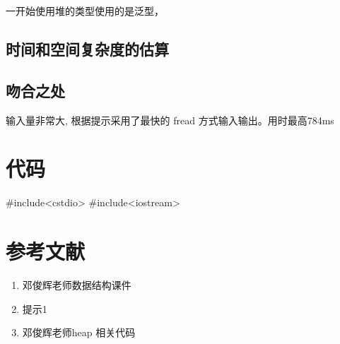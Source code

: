 \documentclass[12pt,a4paper]{ctexart}
\def\tightlist{}
\newenvironment{Shaded}{}{}
\newcommand{\OtherTok}[1]{\textcolor[rgb]{0.00,0.44,0.13}{{#1}}}
\begin{document}
一开始使用堆的类型使用的是泛型，

\subsection{时间和空间复杂度的估算}\label{ux65f6ux95f4ux548cux7a7aux95f4ux590dux6742ux5ea6ux7684ux4f30ux7b97}

\subsection{吻合之处}\label{ux543bux5408ux4e4bux5904}

输入量非常大, 根据提示采用了最快的 fread 方式输入输出。用时最高784ms

\section{代码}\label{ux4ee3ux7801}

\begin{Shaded}
\begin{Highlighting}[]
\OtherTok{#include<cstdio>}
\OtherTok{#include<iostream>}
\end{Highlighting}
\end{Shaded}

\section{参考文献}\label{ux53c2ux8003ux6587ux732e}

\begin{enumerate}
\def\labelenumi{\arabic{enumi}.}
\tightlist
\item
  邓俊辉老师数据结构课件
\item
  提示1
\item
  邓俊辉老师heap 相关代码
\end{enumerate}
\end{document}
